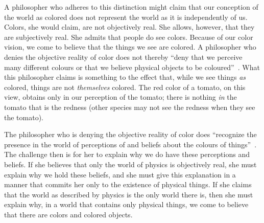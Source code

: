 \documentclass[11pt]{standalone}
\begin{document}
\begin{spacing}{1.5}
\begin{comment}
Finally, one might claim that some things are non-existent, and that
anyone who takes themselves to be thinking or talking about such a
thing is actually thinking or talking about nothing at all.  This is
the sort of denial I would make regarding the existence of ghosts.
van Inwagen, as we shall see, attempts to deny that chairs exist while
still holding propositions like ``there is another chair upstairs'' to
be true.  If, on the other hand, someone tells me ``there is a ghost
in the pantry'' I am perfectly happy to maintain that what they said
is simply false.  Few philosophers make denials of this sort about
``real or significant'' things, because the beliefs we have about such
things (tables, chairs, people, custard) are deeply integrated into
our daily lives; such a denial will render much of our everyday
discourse false, if not nonsensical.  Nonetheless Peter Unger does
attempt this sort of denial; we address his arguments in
sections~\ref{resolute} and~\ref{unger}.
\end{comment}


A philosopher who adheres to this distinction might claim that our
conception of the world as colored does not represent the world as it
is independently of us.  Colors, she would claim, are not objectively
real.  She allows, however, that they are subjectively real.  She
admits that people do see colors.  Because of our color vision, we
come to believe that the things we see are colored.  A philosopher who
denies the objective reality of color does not thereby ``deny that we
perceive many different colours or that we believe physical objects to
be coloured''~\citep[145]{stroud2000a}.  What this philosopher claims
is something to the effect that, while we see things {\em as} colored,
things are not {\em themselves} colored.  The red color of a tomato,
on this view, obtains only in our perception of the tomato; there is
nothing {\em in} the tomato that is the redness (other species may not
see the redness when they see the tomato).

The philosopher who is denying the objective reality of color does
``recognize the presence in the world of perceptions of and beliefs
about the colours of things''~\citep[199]{stroud2000a}.  The challenge
then is for her to explain why we do have these perceptions and
beliefs.  If she believes that only the world of physics is
objectively real, she must explain why we hold these beliefs, and she
must give this explanation in a manner that commits her only to the
existence of physical things.  If she claims that the world as
described by physics is the only world there is, then she must explain
why, in a world that contains only physical things, we come to believe
that there are colors and colored objects.


\end{spacing}
\end{document}
